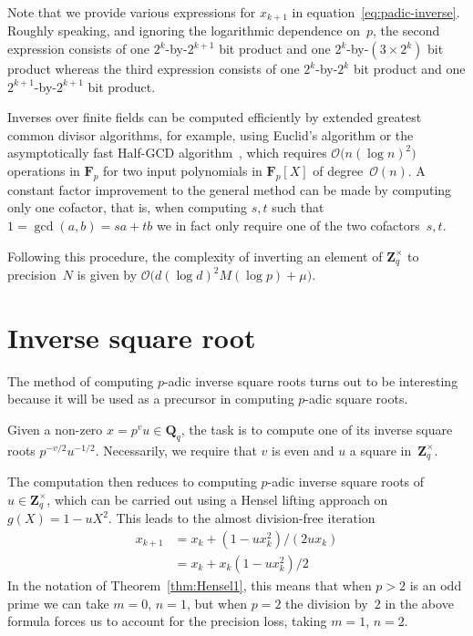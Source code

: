 Note that we provide various expressions for $x_{k+1}$ in 
equation~\eqref{eq:padic-inverse}.  Roughly speaking, and ignoring 
the logarithmic dependence on~$p$, the second expression consists of 
one $2^k$-by-$2^{k+1}$ bit product and one $2^k$-by-$(3 \times 2^k)$ bit 
product whereas the third expression consists of one $2^k$-by-$2^k$ bit 
product and one $2^{k+1}$-by-$2^{k+1}$ bit product.

Inverses over finite fields can be computed efficiently by 
extended greatest common divisor algorithms, for example, using 
Euclid's algorithm or the asymptotically fast Half-GCD 
algorithm~\citep{ThullYap1990}, which requires 
$\mathcal{O}\bigl(n (\log n)^2\bigr)$ operations in $\mathbf{F}_p$ 
for two input polynomials in $\mathbf{F}_p[X]$ of degree~$\mathcal{O}(n)$.  
A constant factor improvement to the general method can be made by 
computing only one cofactor, that is, when computing $s, t$ such that 
$1 = \gcd(a,b) = sa + tb$ we in fact only require one of the two 
cofactors~$s, t$.

Following this procedure, the complexity of inverting an element of 
$\mathbf{Z}_q^{\times}$ to precision~$N$ is given by 
$\mathcal{O}\bigl( d (\log d)^2 M(\log p) + \mu \bigr)$.

\section{Inverse square root}

The method of computing $p$-adic inverse square roots turns out 
to be interesting because it will be used as a precursor in computing 
$p$-adic square roots.

Given a non-zero $x = p^v u \in \mathbf{Q}_q$, the task is to compute 
one of its inverse square roots $p^{-v/2} u^{-1/2}$.  Necessarily, 
we require that $v$ is even and $u$ a square in~$\mathbf{Z}_q^{\times}$.

The computation then reduces to computing $p$-adic inverse square 
roots of $u \in \mathbf{Z}_q^{\times}$, which can be carried out 
using a Hensel lifting approach on $g(X) = 1 - u X^2$.  This leads 
to the almost division-free iteration
\begin{equation}
\begin{split}
x_{k+1} & = x_k + (1 - u x_k^2) / (2 u x_k) \\
        & = x_k + x_k (1 - u x_k^2) / 2
\end{split}
\end{equation}
In the notation of Theorem~\ref{thm:Hensel1}, this means that when 
$p > 2$ is an odd prime we can take $m = 0$, $n = 1$, but when $p = 2$ 
the division by~$2$ in the above formula forces us to account for 
the precision loss, taking $m = 1$, $n = 2$.

